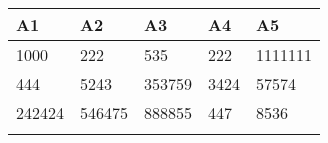 \begin{table}[htbp]
\centering
\begin{tabular}{|l|l|l|l|l|}
\hline
A1     & A2     & A3     & A4   & A5      \\ \hline
1000   & 222    & 535    & 222  & 1111111 \\ \hline
444    & 5243   & 353759 & 3424 & 57574   \\ \hline
242424 & 546475 & 888855 & 447  & 8536    \\ \hline
\label{fig:random}
\end{tabular}
\end{table}